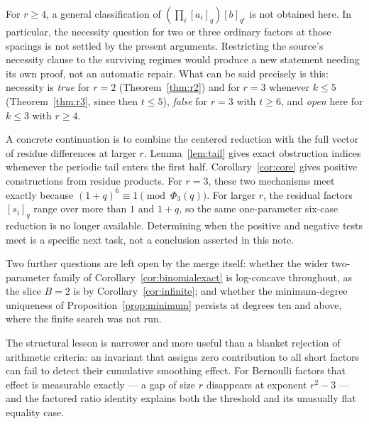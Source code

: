 \documentclass[11pt]{article}
\theoremstyle{research}
\theoremstyle{definition}
\newcommand{\qi}[1]{[#1]_q}
\newcommand{\qir}[2]{[#1]_{q^{#2}}}
\numberwithin{equation}{section}
\begin{document}
For $r\ge4$, a general classification of
$(\prod_i\qi{a_i})\qir b r$ is not obtained here. In particular, the
necessity question for two or three ordinary factors at those spacings
is not settled by the present arguments.
Restricting the source's necessity clause to the surviving regimes would
produce a new statement needing its own proof, not an automatic repair.
What can be said precisely is this: necessity is \emph{true} for $r=2$
(Theorem~\ref{thm:r2}) and for $r=3$ whenever $k\le5$
(Theorem~\ref{thm:r3}, since then $t\le5$), \emph{false} for $r=3$ with
$t\ge6$, and \emph{open} here for $k\le3$ with $r\ge4$.

A concrete continuation is to combine the centered reduction with the
full vector of residue differences at larger $r$.
Lemma~\ref{lem:tail} gives exact obstruction indices whenever the
periodic tail enters the first half. Corollary~\ref{cor:core} gives
positive constructions from residue products.
For $r=3$, these two mechanisms meet exactly because
$(1+q)^6\equiv1\pmod{\Phi_3(q)}$.
For larger $r$, the residual factors $\qi{s_i}$ range over more than
$1$ and $1+q$, so the same one-parameter six-case reduction is no longer
available. Determining when the positive and negative tests meet is a
specific next task, not a conclusion asserted in this note.

Two further questions are left open by the merge itself: whether the wider
two-parameter family of Corollary~\ref{cor:binomialexact} is log-concave
throughout, as the slice $B=2$ is by Corollary~\ref{cor:infinite}; and
whether the minimum-degree uniqueness of Proposition~\ref{prop:minimum}
persists at degrees ten and above, where the finite search was not run.

The structural lesson is narrower and more useful than a blanket rejection
of arithmetic criteria: an invariant that assigns zero contribution to all
short factors can fail to detect their cumulative smoothing effect. For
Bernoulli factors that effect is measurable exactly --- a gap of size $r$
disappears at exponent $r^2-3$ --- and the factored ratio identity explains
both the threshold and its unusually flat equality case.

\appendix
\end{document}
